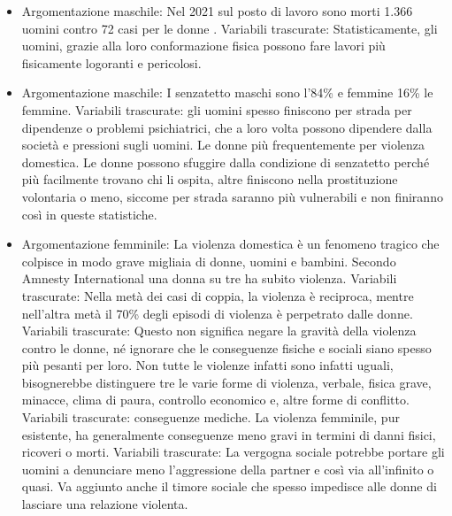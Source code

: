 \documentclass[12pt]{book} %
\begin{document}
\begin{mdframed}[linewidth=1pt]
\begin{itemize}
\item Argomentazione maschile: Nel 2021 sul posto di lavoro sono morti 1.366 uomini contro 72 casi per le donne .
Variabili trascurate: Statisticamente, gli uomini, grazie alla loro conformazione fisica possono fare lavori più fisicamente logoranti e pericolosi. 
\item Argomentazione maschile: I senzatetto maschi sono l'84\% e femmine 16\% le femmine.
Variabili trascurate: gli uomini spesso finiscono per strada per dipendenze o problemi psichiatrici, che a loro volta possono dipendere dalla società e pressioni sugli uomini. Le donne più frequentemente per violenza domestica. Le donne possono sfuggire dalla condizione di senzatetto perché più facilmente trovano chi li ospita, altre finiscono nella prostituzione volontaria o meno, siccome per strada saranno più vulnerabili e non finiranno così in queste statistiche.
\item Argomentazione femminile: La violenza domestica è un fenomeno tragico che colpisce in modo grave migliaia di donne, uomini e bambini. Secondo Amnesty International una donna su tre ha subito violenza. 
Variabili trascurate: Nella metà dei casi di coppia, la violenza è reciproca, mentre nell'altra metà il 70\% degli episodi di violenza è perpetrato dalle donne. 
Variabili trascurate: Questo non significa negare la gravità della violenza contro le donne, né ignorare che le conseguenze fisiche e sociali siano spesso più pesanti per loro. Non tutte le violenze infatti sono infatti uguali, bisognerebbe distinguere tre le varie forme di violenza, verbale, fisica grave, minacce, clima di paura, controllo economico e, altre forme di conflitto. 
Variabili trascurate: conseguenze mediche. La violenza femminile, pur esistente, ha generalmente conseguenze meno gravi in termini di danni fisici, ricoveri o morti. 
Variabili trascurate: La vergogna sociale potrebbe portare gli uomini a denunciare meno l'aggressione della partner e così via all'infinito o quasi. Va aggiunto anche il timore sociale che spesso impedisce alle donne di lasciare una relazione violenta.

\end{itemize}
\end{mdframed}
\end{document}
